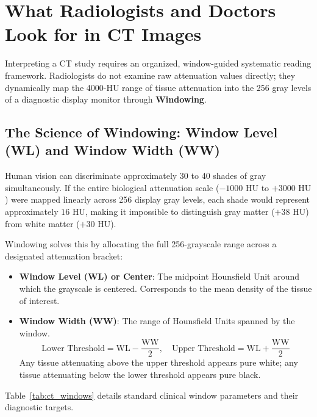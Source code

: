 \documentclass[11pt,a4paper]{article}
\begin{document}
\section{What Radiologists and Doctors Look for in CT Images}

Interpreting a CT study requires an organized, window-guided systematic reading framework. Radiologists do not examine raw attenuation values directly; they dynamically map the 4000-HU range of tissue attenuation into the 256 gray levels of a diagnostic display monitor through \textbf{Windowing}.

\subsection{The Science of Windowing: Window Level (WL) and Window Width (WW)}
Human vision can discriminate approximately 30 to 40 shades of gray simultaneously. If the entire biological attenuation scale ($-1000\text{ HU}$ to $+3000\text{ HU}$) were mapped linearly across 256 display gray levels, each shade would represent approximately $16\text{ HU}$, making it impossible to distinguish gray matter ($+38\text{ HU}$) from white matter ($+30\text{ HU}$).

Windowing solves this by allocating the full 256-grayscale range across a designated attenuation bracket:
\begin{itemize}
    \item \textbf{Window Level (WL) or Center}: The midpoint Hounsfield Unit around which the grayscale is centered. Corresponds to the mean density of the tissue of interest.
    \item \textbf{Window Width (WW)}: The range of Hounsfield Units spanned by the window.
    \begin{equation}
        \text{Lower Threshold} = \text{WL} - \frac{\text{WW}}{2}, \quad \text{Upper Threshold} = \text{WL} + \frac{\text{WW}}{2}
    \end{equation}
    Any tissue attenuating above the upper threshold appears pure white; any tissue attenuating below the lower threshold appears pure black.
\end{itemize}

Table~\ref{tab:ct_windows} details standard clinical window parameters and their diagnostic targets.
\end{document}
